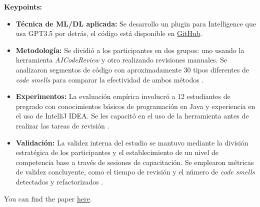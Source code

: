 \documentclass{article}
\begin{document}
\textbf{Keypoints:}

\begin{itemize}
    \item \textbf{Técnica de ML/DL aplicada:} Se desarrollo un plugin para Intelligence que usa GPT3.5 por detrás, el código está disponible en \href{https://github.com/ElsevierSoftwareX/SOFTX-D-23-00603}{GitHub}.
    
    \item \textbf{Metodología:} Se dividió a los participantes en dos grupos: uno usando la herramienta \textit{AICodeReview} y otro realizando revisiones manuales. Se analizaron segmentos de código con aproximadamente 30 tipos diferentes de \textit{code smells} para comparar la efectividad de ambos métodos \cite{ALMEIDA2024101677}.
    
    \item \textbf{Experimentos:} La evaluación empírica involucró a 12 estudiantes de pregrado con conocimientos básicos de programación en Java y experiencia en el uso de IntelliJ IDEA. Se les capacitó en el uso de la herramienta antes de realizar las tareas de revisión \cite{ALMEIDA2024101677}.
    
    \item \textbf{Validación:} La validez interna del estudio se mantuvo mediante la división estratégica de los participantes y el establecimiento de un nivel de competencia base a través de sesiones de capacitación. Se emplearon métricas de validez concluyente, como el tiempo de revisión y el número de \textit{code smells} detectados y refactorizados \cite{ALMEIDA2024101677}.
\end{itemize}


You can find the paper \href{https://www.sciencedirect.com/science/article/pii/S2352711024000487}{here}.





\end{document}
